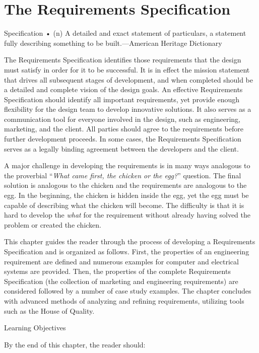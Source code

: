 \section{The Requirements
Specification}\label{the-requirements-specification}

Specification • (n) A detailed and exact statement of particulars, a
statement fully describing something to be built.---American Heritage
Dictionary

The Requirements Specification identifies those requirements that the
design must satisfy in order for it to be successful. It is in effect
the mission statement that drives all subsequent stages of development,
and when completed should be a detailed and complete vision of the
design goals. An effective Requirements Specification should identify
all important requirements, yet provide enough flexibility for the
design team to develop innovative solutions. It also serves as a
communication tool for everyone involved in the design, such as
engineering, marketing, and the client. All parties should agree to the
requirements before further development proceeds. In some cases, the
Requirements Specification serves as a legally binding agreement between
the developers and the client.

A major challenge in developing the requirements is in many ways
analogous to the proverbial ``\emph{What came first, the chicken or the
egg?}'' question. The final solution is analogous to the chicken and the
requirements are analogous to the egg. In the beginning, the chicken is
hidden inside the egg, yet the egg must be capable of describing what
the chicken will become. The difficulty is that it is hard to develop
the \emph{what} for the requirement without already having solved the
problem or created the chicken.

This chapter guides the reader through the process of developing a
Requirements Specification and is organized as follows. First, the
properties of an engineering requirement are defined and numerous
examples for computer and electrical systems are provided. Then, the
properties of the complete Requirements Specification (the collection of
marketing and engineering requirements) are considered followed by a
number of case study examples. The chapter concludes with advanced
methods of analyzing and refining requirements, utilizing tools such as
the House of Quality.

Learning Objectives

By the end of this chapter, the reader should:

